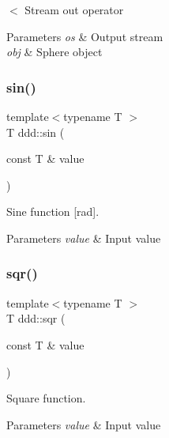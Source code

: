 $<$ Stream out operator 


\begin{DoxyParams}{Parameters}
{\em os} & Output stream \\
\hline
{\em obj} & Sphere object \\
\hline
\end{DoxyParams}
\mbox{\label{namespaceddd_a3c2355d52318b82d63a4ff3525bb651a}} 
\subsubsection{\texorpdfstring{sin()}{sin()}}
{\footnotesize\ttfamily template$<$typename T $>$ \\
T ddd\+::sin (\begin{DoxyParamCaption}\item[{const T \&}]{value }\end{DoxyParamCaption})\hspace{0.3cm}{\ttfamily [inline]}}



Sine function \mbox{[}rad\mbox{]}. 


\begin{DoxyParams}{Parameters}
{\em value} & Input value \\
\hline
\end{DoxyParams}
\mbox{\label{namespaceddd_a1d4703ab7fa9c58943ff44b368dacb4b}} 
\subsubsection{\texorpdfstring{sqr()}{sqr()}}
{\footnotesize\ttfamily template$<$typename T $>$ \\
T ddd\+::sqr (\begin{DoxyParamCaption}\item[{const T \&}]{value }\end{DoxyParamCaption})\hspace{0.3cm}{\ttfamily [inline]}}



Square function. 


\begin{DoxyParams}{Parameters}
{\em value} & Input value \\
\hline
\end{DoxyParams}
\mbox{\label{namespaceddd_a99ebeda8499ba29e0302f0f3c6e43549}} 
